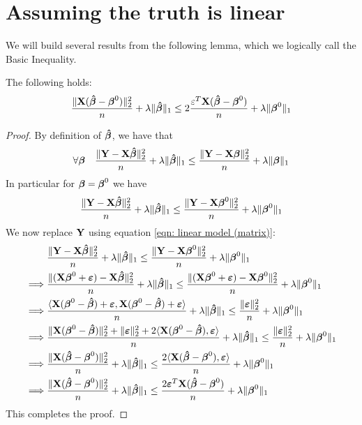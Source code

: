 \section{Assuming the truth is linear}
We will build several results from the following lemma, which we logically call the Basic Inequality.
\begin{lemma}
    \label{lemma: basic inequality}
    The following holds:
    \[
        \frac{\| \X (\btahat-\bta^{0})\|_{2}^{2}}{n} + \lambda\|\btahat\|_{1} \leq 2 \frac{\varepsilon^{T} \X (\btahat-\bta^{0})}{n}+\lambda \| \bta^{0} \|_{1}
    \]
\end{lemma}
\begin{proof}
    By definition of $\btahat$, we have that
    \[
        \forall \bta \quad \frac{\| \Y-\X \btahat \|_{2}^{2}}{n} + \lambda \| \btahat \|_{1} \leq \frac{\|\Y-\X \bta \|_{2}^{2}}{n}+\lambda \| \bta \|_{1}
    \]
    In particular for $\bta = \bta^0$ we have
    \[
        \frac{\| \Y-\X \btahat \|_{2}^{2}}{n}+\lambda\| \btahat \|_{1} \leq \frac{ \| \Y-\X \bta^0\|_{2}^{2}}{n}+\lambda \| \bta^0\|_{1}
    \]
    We now replace $\Y$ using equation \eqref{eqn: linear model (matrix)}:
    \begin{align*}
                 & \frac{\|\Y  - \X \btahat \|_{2}^{2}}{n} + \lambda \| \btahat\|_{1} \leq \frac{\| \Y  - \X \bta^0 \|_2^2}{n}+\lambda\|\bta^{0}\|_{1}                                                     \\
        \implies &
        \frac{\| (\X \bta^0 + \eps) - \X \btahat \|_{2}^{2}}{n}+\lambda\| \btahat \|_{1} \leq \frac{ \| (\X \bta^0 + \eps)-\X \bta^0\|_{2}^{2}}{n}+\lambda \| \bta^0\|_{1}                                 \\
        \implies &
        \frac{\langle \X ( \bta^0 - \btahat) + \eps, \X ( \bta^0 - \btahat) + \eps \rangle}{n}+\lambda \| \btahat \|_{1} \leq \frac{ \| \eps \|_{2}^{2}}{n}+\lambda \| \bta^0\|_{1}                        \\
        \implies &
        \frac{\| \X (\bta^0 - \btahat) \| _2^2 + \| \eps \|_2^2 + 2 \langle \X ( \bta^0 - \btahat),  \eps \rangle}{n}+\lambda \| \btahat \|_{1} \leq \frac{ \| \eps \|_{2}^{2}}{n}+\lambda \| \bta^0\|_{1} \\
        \implies &
        \frac{\| \X (\btahat - \bta^0) \| _2^2}{n} + \lambda \| \btahat \|_{1} \leq \frac{2 \langle \X ( \btahat - \bta^0),  \eps \rangle}{n} + \lambda \| \bta^0\|_{1}                                    \\
        \implies &
        \frac{\| \X (\btahat - \bta^0) \| _2^2}{n} + \lambda \| \btahat \|_{1} \leq \frac{2 \eps^T \X ( \btahat - \bta^0)}{n} + \lambda \| \bta^0\|_{1}                                                    \\
    \end{align*}
    This completes the proof.
\end{proof}
